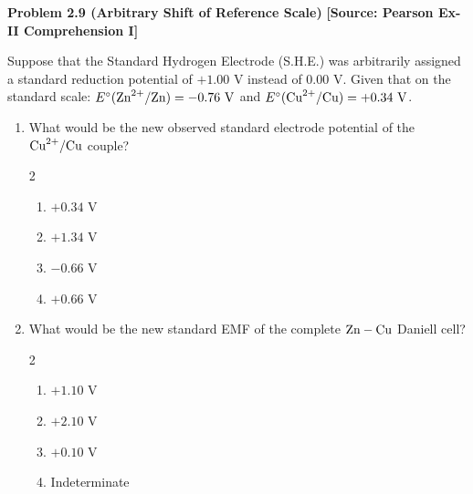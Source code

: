\begin{problembox}
\textbf{Problem 2.9 (Arbitrary Shift of Reference Scale)} \hfill \textbf{[Source: Pearson Ex-II Comprehension I]}

Suppose that the Standard Hydrogen Electrode (S.H.E.) was arbitrarily assigned a standard reduction potential of $+1.00\text{ V}$ instead of $0.00\text{ V}$.
Given that on the standard scale:
$E^\circ(\ce{Zn^2+/Zn}) = -0.76\text{ V}$ and $E^\circ(\ce{Cu^2+/Cu}) = +0.34\text{ V}$.

\begin{enumerate}[label=\textbf{Part \arabic*:}]
    \item What would be the new observed standard electrode potential of the $\ce{Cu^2+/Cu}$ couple?
    \begin{multicols}{2}
    \begin{enumerate}[label=(\alph*)]
        \item $+0.34\text{ V}$
        \item $+1.34\text{ V}$
        \item $-0.66\text{ V}$
        \item $+0.66\text{ V}$
    \end{enumerate}
    \end{multicols}
    
    \item What would be the new standard EMF of the complete $\ce{Zn - Cu}$ Daniell cell?
    \begin{multicols}{2}
    \begin{enumerate}[label=(\alph*)]
        \item $+1.10\text{ V}$
        \item $+2.10\text{ V}$
        \item $+0.10\text{ V}$
        \item Indeterminate
    \end{enumerate}
    \end{multicols}
\end{enumerate}
\end{problembox}
